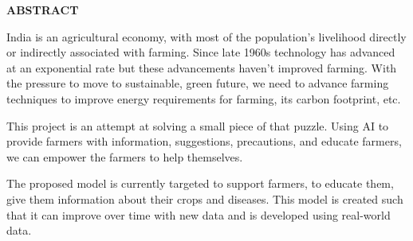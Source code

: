 \documentclass[../Report.tex]{subfiles}
\begin{document}
\begin{center}
    \textbf{ABSTRACT}
\end{center}

India is an agricultural economy, with most of the population's livelihood directly or indirectly associated with farming. Since late 
1960s technology has advanced at an exponential rate but these advancements haven't improved farming. With the pressure to move to
sustainable, green future, we need to advance farming techniques to improve energy requirements for farming, its carbon footprint, etc. \par

This project is an attempt at solving a small piece of that puzzle. Using AI to provide farmers with information, suggestions, precautions,
and educate farmers, we can empower the farmers to help themselves.\par

The proposed model is currently targeted to support farmers, to educate them, give them information about their crops and diseases. This model is created such that it can improve over time with new data and is developed using real-world data.

\pagebreak
\end{document}
